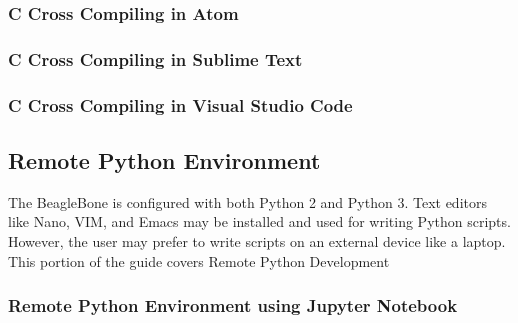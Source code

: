         \subsubsection{C Cross Compiling in Atom}
        \subsubsection{C Cross Compiling in Sublime Text}
        \subsubsection{C Cross Compiling in Visual Studio Code}
    \subsection{Remote Python Environment}
    The BeagleBone is configured with both Python 2 and Python 3. Text editors like Nano, VIM, and Emacs may be installed and used for writing Python scripts. However, the user may prefer to write scripts on an external device like a laptop. This portion of the guide covers Remote Python Development
        \subsubsection{Remote Python Environment using Jupyter Notebook}
